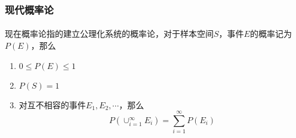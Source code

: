 \subsubsection{现代概率论}
\paragraph{}
现在概率论指的建立公理化系统的概率论，对于样本空间$S$，事件$E$的概率记为$P(E)$，那么
\begin{enumerate}
\item $ 0 \leq P(E) \leq 1$
\item $P(S) = 1$
\item 对互不相容的事件$E_1, E_2, \cdots$，那么
$$
P\left(\cup_{i=1}^\infty E_i\right) = \sum_{i=1}^\infty P(E_i)
$$
\end{enumerate}




